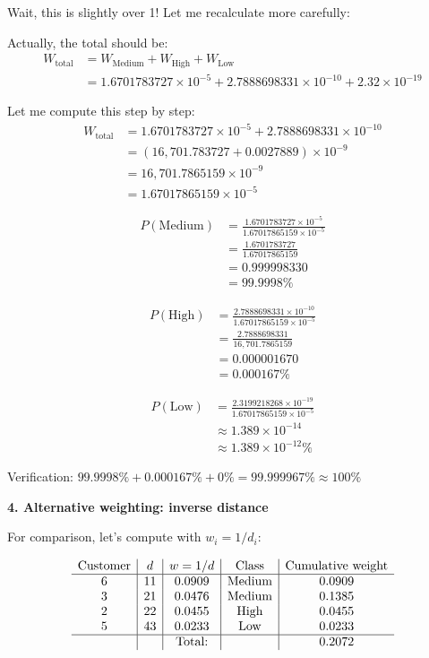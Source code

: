 \documentclass[12pt]{article}
\begin{document}
\begin{computation}
Wait, this is slightly over 1! Let me recalculate more carefully:

Actually, the total should be:
\begin{align*}
W_{\text{total}} &= W_{\text{Medium}} + W_{\text{High}} + W_{\text{Low}} \\
&= 1.6701783727 \times 10^{-5} + 2.7888698331 \times 10^{-10} + 2.32 \times 10^{-19}
\end{align*}

Let me compute this step by step:
\begin{align*}
W_{\text{total}} &= 1.6701783727 \times 10^{-5} + 2.7888698331 \times 10^{-10} \\
&= (16{,}701.783727 + 0.0027889) \times 10^{-9} \\
&= 16{,}701.7865159 \times 10^{-9} \\
&= 1.67017865159 \times 10^{-5}
\end{align*}

\begin{align*}
P(\text{Medium}) &= \frac{1.6701783727 \times 10^{-5}}{1.67017865159 \times 10^{-5}} \\
&= \frac{1.6701783727}{1.67017865159} \\
&= 0.999998330 \\
&= \boxed{99.9998\%}
\end{align*}

\begin{align*}
P(\text{High}) &= \frac{2.7888698331 \times 10^{-10}}{1.67017865159 \times 10^{-5}} \\
&= \frac{2.7888698331}{16{,}701.7865159} \\
&= 0.000001670 \\
&= \boxed{0.000167\%}
\end{align*}

\begin{align*}
P(\text{Low}) &= \frac{2.3199218268 \times 10^{-19}}{1.67017865159 \times 10^{-5}} \\
&\approx 1.389 \times 10^{-14} \\
&\approx \boxed{1.389 \times 10^{-12}\%}
\end{align*}

Verification: \(99.9998\% + 0.000167\% + 0\% = 99.999967\% \approx 100\%\) \checkmark

\textbf{4. Alternative weighting: inverse distance}

For comparison, let's compute with \(w_i = 1/d_i\):

\[
\begin{array}{c|c|c|c|c}
\text{Customer} & d & w = 1/d & \text{Class} & \text{Cumulative weight} \\
\hline
6 & 11 & 0.0909 & \text{Medium} & 0.0909 \\
3 & 21 & 0.0476 & \text{Medium} & 0.1385 \\
2 & 22 & 0.0455 & \text{High} & 0.0455 \\
5 & 43 & 0.0233 & \text{Low} & 0.0233 \\
\hline
& & \text{Total:} & & 0.2072 \\
\end{array}
\]


\end{computation}
\end{document}
